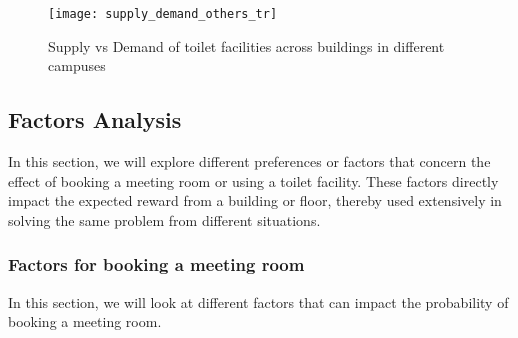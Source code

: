 \begin{itemize}
    
\end{itemize}



\begin{figure}[H]
\centering
\texttt{[image: supply\_demand\_others\_tr]}
\caption{Supply vs Demand of toilet facilities across buildings in different campuses}
\label{fig:sp-others-2}
\end{figure}


\subsection{Factors Analysis} \label{factor_analysis}

In this section, we will explore different preferences or factors that concern the effect of booking a meeting room or using a toilet facility. These factors directly impact the expected reward from a building or floor, thereby used extensively in solving the same problem from different situations.

\subsubsection{Factors for booking a meeting room}
In this section, we will look at different factors that can impact the probability of booking a meeting room.

